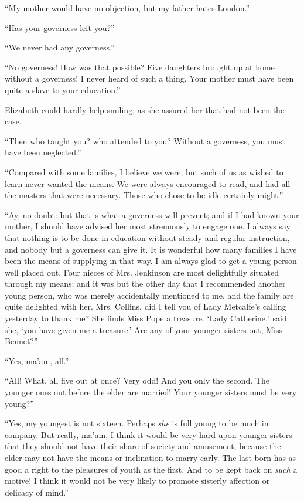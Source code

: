 ``My mother would have no objection, but my father hates London.''

``Has your governess left you?''

``We never had any governess.''

``No governess! How was that possible? Five daughters brought up at home without a governess! I never heard of such a thing. Your mother must have been quite a slave to your education.''

Elizabeth could hardly help smiling, as she assured her that had not been the case.

``Then who taught you? who attended to you? Without a governess, you must have been neglected.''

``Compared with some families, I believe we were; but such of us as wished to learn never wanted the means. We were always encouraged to read, and had all the masters that were necessary. Those who chose to be idle certainly might.''

``Ay, no doubt: but that is what a governess will prevent; and if I had known your mother, I should have advised her most strenuously to engage one. I always say that nothing is to be done in education without steady and regular instruction, and nobody but a governess can give it. It is wonderful how many families I have been the means of supplying in that way. I am always glad to get a young person well placed out. Four nieces of Mrs. Jenkinson are most delightfully situated through my means; and it was but the other day that I recommended another young person, who was merely accidentally mentioned to me, and the family are quite delighted with her. Mrs. Collins, did I tell you of Lady Metcalfe's calling yesterday to thank me? She finds Miss Pope a treasure. `Lady Catherine,' said she, `you have given me a treasure.' Are any of your younger sisters out, Miss Bennet?''

``Yes, ma'am, all.''

``All! What, all five out at once? Very odd! And you only the second. The younger ones out before the elder are married! Your younger sisters must be very young?''

``Yes, my youngest is not sixteen. Perhaps \textit{she} is full young to be much in company. But really, ma'am, I think it would be very hard upon younger sisters that they should not have their share of society and amusement, because the elder may not have the means or inclination to marry early. The last born has as good a right to the pleasures of youth as the first. And to be kept back on \textit{such} a motive! I think it would not be very likely to promote sisterly affection or delicacy of mind.''


